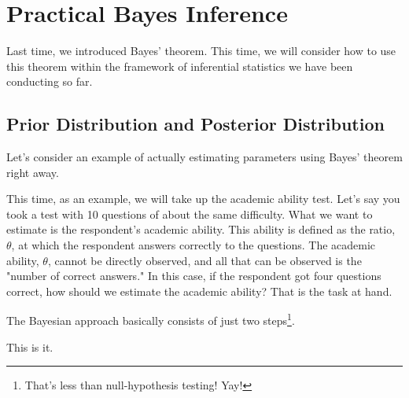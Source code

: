 \documentclass{ltjsbook}
\begin{document}
\VerbatimFootnotes
\chapter{Practical Bayes Inference}
\label{m26_bayesian2}
Last time, we introduced Bayes' theorem. This time, we will consider how to use this theorem within the framework of inferential statistics we have been conducting so far.


\section{Prior Distribution and Posterior Distribution}
Let's consider an example of actually estimating parameters using Bayes' theorem right away.

This time, as an example, we will take up the academic ability test.
Let's say you took a test with 10 questions of about the same difficulty. What we want to estimate is the respondent's academic ability. This ability is defined as the ratio, $\theta$, at which the respondent answers correctly to the questions. The academic ability, $\theta$, cannot be directly observed, and all that can be observed is the "number of correct answers." In this case, if the respondent got four questions correct, how should we estimate the academic ability? That is the task at hand.

The Bayesian approach basically consists of just two steps\footnote{That's less than null-hypothesis testing! Yay!}.

This is it.
\end{document}
